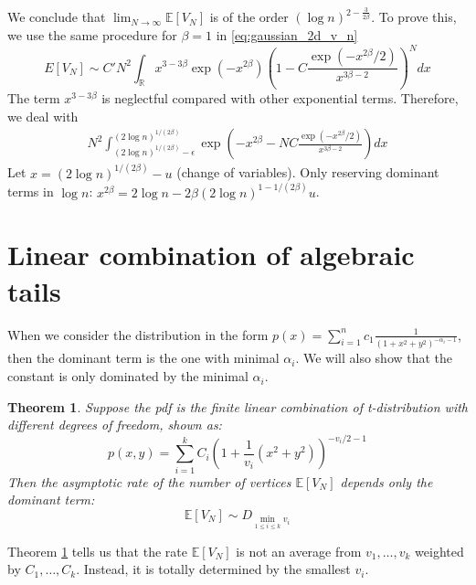 \documentclass{article}
\newtheorem{theorem}{Theorem}
\def\E{\mathbb{E}}
\def\R{\mathbb{R}}
\begin{document}
We conclude that $\lim_{N\to \infty} \E[V_N]$
is of the order $(\log n)^{2-\frac{3}{2\beta}}$.
To prove this, we use the same procedure for $\beta=1$
in \eqref{eq:gaussian_2d_v_n}
$$
E[V_N]
\sim C'
N^2 \int_{\R}
x^{3-3\beta} \exp(-x^{2\beta}) \left(
1-C\frac{\exp(-x^{2\beta}/2)}{x^{3\beta-2}}
\right)^N dx
$$
The term $x^{3-3\beta}$
is neglectful compared with other
exponential terms.
Therefore, we deal with 
\begin{align*}
    N^2 \int_{(2\log n)^{1/(2\beta)}-\epsilon}^{(2\log n)^{1/(2\beta)}}
\exp\left(
    -x^{2\beta} -N
    C\frac{\exp(-x^{2\beta}/2)}{x^{3\beta-2}}
 \right) dx
\end{align*}
Let $x=(2\log n)^{1/(2\beta)}-u$ (change of variables).
Only reserving dominant terms in $\log n$:
$
x^{2\beta} = 2\log n - 2\beta
(2 \log n)^{1-1/(2\beta)}u$.

\section{Linear combination of algebraic tails}
When we consider the distribution in the form
$p(x)=\sum_{i=1}^n c_1\frac{1}{(1+x^2+y^2)^{-\alpha_i-1}}$,
then the dominant term is the one with minimal $\alpha_i$.
We will also show that the constant is only dominated by the minimal $\alpha_i$.

\begin{theorem}\label{thm:combination_all}
Suppose the pdf is the finite linear combination of t-distribution with
different degrees of freedom, shown as:
\begin{equation}
    p(x,y) = \sum_{i=1}^k C_i (1+\frac{1}{v_i}(x^2+y^2))^{-v_i/2 - 1}
\end{equation}
Then the asymptotic rate of the number of vertices $\E[V_N]$
depends only the dominant term:
\begin{equation}
    \E[V_N] \sim D_{\min_{1\leq i\leq k} v_i}
\end{equation}
\end{theorem}
Theorem \ref{thm:combination_all} tells us that
the rate $\E[V_N]$ is not an average from $v_1, \dots, v_k$
weighted by $C_1, \dots, C_k$. Instead, it is totally determined by
the smallest $v_i$.
\end{document}
